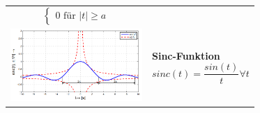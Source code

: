\begin{tabular}{p{5cm} p{12.5cm}}
$$\begin{cases}
                     0 \textrm{ für } |t| \geq a
                   \end{cases}$$                                       \\
  \includegraphics[width=5cm, valign=t]{include/Wichtige Funktionen/img/SincFunktion.png}     &
  \textbf{Sinc-Funktion}
  \footnotesize
  $$sinc(t) = \frac{sin(t)}{t} \forall t$$                                                                                     \\
\end{tabular}
